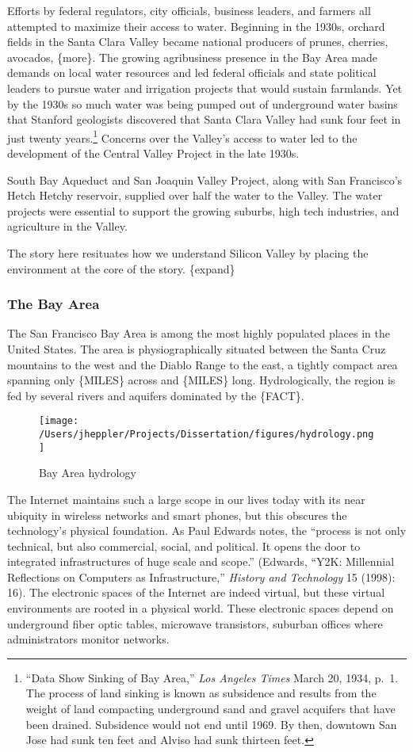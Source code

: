 \documentclass[11pt,article,oneside]{memoir}
\makeatletter
\def\maxwidth{\ifdim\Gin@nat@width>\linewidth\linewidth
\else\Gin@nat@width\fi}
\let\Oldincludegraphics\includegraphics
\renewcommand{\includegraphics}[1]{\Oldincludegraphics[width=\maxwidth]{#1}}
\makeatother
\begin{document}
Efforts by federal regulators, city officials, business leaders, and
farmers all attempted to maximize their access to water. Beginning in
the 1930s, orchard fields in the Santa Clara Valley became national
producers of prunes, cherries, avocados, \{more\}. The growing
agribusiness presence in the Bay Area made demands on local water
resources and led federal officials and state political leaders to
pursue water and irrigation projects that would sustain farmlands. Yet
by the 1930s so much water was being pumped out of underground water
basins that Stanford geologists discovered that Santa Clara Valley had
sunk four feet in just twenty years.\footnote{``Data Show Sinking of Bay
  Area,'' \emph{Los Angeles Times} March 20, 1934, p.~1. The process of
  land sinking is known as subsidence and results from the weight of
  land compacting underground sand and gravel acquifers that have been
  drained. Subsidence would not end until 1969. By then, downtown San
  Jose had sunk ten feet and Alviso had sunk thirteen feet.} Concerns
over the Valley's access to water led to the development of the Central
Valley Project in the late 1930s.

South Bay Aqueduct and San Joaquin Valley Project, along with San
Francisco's Hetch Hetchy reservoir, supplied over half the water to the
Valley. The water projects were essential to support the growing
suburbs, high tech industries, and agriculture in the Valley.

The story here resituates how we understand Silicon Valley by placing
the environment at the core of the story. \{expand\}

\subsubsection{The Bay Area}

The San Francisco Bay Area is among the most highly populated places in
the United States. The area is physiographically situated between the
Santa Cruz mountains to the west and the Diablo Range to the east, a
tightly compact area spanning only \{MILES\} across and \{MILES\} long.
Hydrologically, the region is fed by several rivers and aquifers
dominated by the \{FACT\}.

\begin{figure}[htbp]
\centering
\texttt{[image: /Users/jheppler/Projects/Dissertation/figures/hydrology.png]}
\caption{Bay Area hydrology}
\end{figure}

The Internet maintains such a large scope in our lives today with its
near ubiquity in wireless networks and smart phones, but this obscures
the technology's physical foundation. As Paul Edwards notes, the
``process is not only technical, but also commercial, social, and
political. It opens the door to integrated infrastructures of huge scale
and scope.'' (Edwards, ``Y2K: Millennial Reflections on Computers as
Infrastructure,'' \emph{History and Technology} 15 (1998): 16). The
electronic spaces of the Internet are indeed virtual, but these virtual
environments are rooted in a physical world. These electronic spaces
depend on underground fiber optic tables, microwave transistors,
suburban offices where administrators monitor networks.
\end{document}
